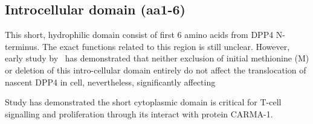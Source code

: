 \subsection{Introcellular domain (aa1-6)}

This short, hydrophilic domain consist of first 6 amino acids from DPP4 N-terminus. The exact functions related to this region is still unclear. However, early study by~\citet{Hong1990} has demonstrated that neither exclusion of initial methionine (M) or deletion of this intro-cellular domain entirely do not affect the translocation of nascent DPP4 in cell, nevertheless, significantly affecting 

Study has demonstrated the short cytoplasmic domain is critical for T-cell signalling and proliferation through its interact with protein CARMA-1. \cite{Ohnuma_2007}